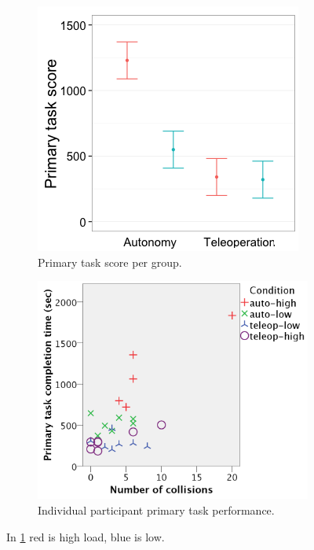 \documentclass[a4paper,12pt,oneside,openright]{bhamthesis}
\begin{document}
 \begin{figure}
 	\centering
 	\begin{subfigure}[b]{0.46\textwidth}
 		\centering
 		\includegraphics[width=\textwidth]{chapter3_fig/primary_score_cropped_pilot.png}
 		\caption{Primary task score per group.}
 		\label{subfig:primary_score_pilot}
 	\end{subfigure}
 	\hfill
 	\begin{subfigure}[b]{0.52\textwidth}
 		\centering
 		\includegraphics[width=\textwidth]{chapter3_fig/speed-acc_pilot.png}
 		\caption{Individual participant primary task performance.}
 		\label{subfig:speed_acc_pilot}
 	\end{subfigure}
 	\hfill
 	\caption{In \ref{subfig:primary_score_pilot} red is high load, blue is low.}
 	\label{fig:score-speed-acc_pilot}
 \end{figure}
 
\end{document}
